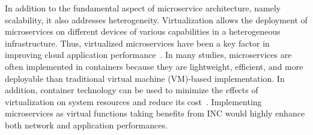 In addition to the fundamental aspect of microservice architecture, namely scalability, it also addresses heterogeneity.  Virtualization allows the deployment of microservices on different devices of various capabilities in a heterogeneous infrastructure. Thus, virtualized microservices have been a key factor in improving cloud application performance~\cite{VirtualizationPerformance, 40}. In many studies, microservices are often implemented in containers because they are lightweight, efficient, and more deployable than traditional virtual machine (VM)-based implementation. In addition, container technology can be used to minimize the effects of virtualization on system resources and reduce its cost~\cite{46}. Implementing microservices as virtual functions taking benefits from INC would highly enhance both network and application performances.  


